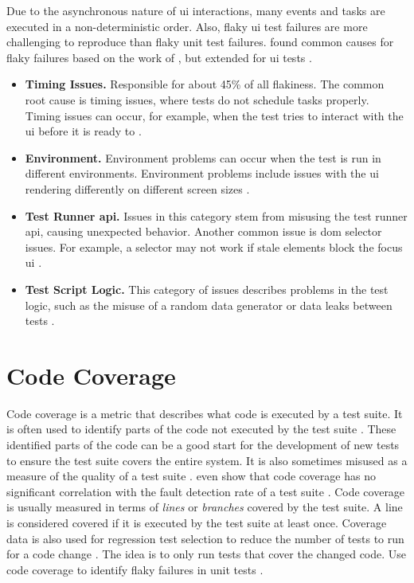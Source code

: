 Due to the asynchronous nature of \ac{ui} interactions, many events and tasks are executed in a non-deterministic order.
Also, flaky \ac{ui} test failures are more challenging to reproduce than flaky unit test failures.
 found common causes for flaky failures based on the work of \citeauthor*{luo_empirical_2014}, but extended for \ac{ui} tests \autocite{luo_empirical_2014,romano_empirical_2021}.

\begin{itemize}
	\item \textbf{Timing Issues.} Responsible for about 45\% of all flakiness. The common root cause is timing issues, where tests do not schedule tasks properly.
	      Timing issues can occur, for example, when the test tries to interact with the \ac{ui} before it is ready to \autocite{romano_empirical_2021}.
	\item \textbf{Environment.} Environment problems can occur when the test is run in different environments.
	      Environment problems include issues with the \ac{ui} rendering differently on different screen sizes \autocite{romano_empirical_2021}.
	\item \textbf{Test Runner \acs{api}.} Issues in this category stem from misusing the test runner \ac{api}, causing unexpected behavior.
	      Another common issue is \ac{dom} selector issues. For example, a selector may not work if stale elements block the focus \ac{ui} \autocite{romano_empirical_2021}.
	\item \textbf{Test Script Logic.} This category of issues describes problems in the test logic, such as the misuse of a random data generator or data leaks between tests \autocite{romano_empirical_2021}.
\end{itemize}


\section{Code Coverage}

Code coverage is a metric that describes what code is executed by a test suite.
It is often used to identify parts of the code not executed by the test suite \autocite{marick_brian_and_smith_john_and_jones_mark_how_1999}.
These identified parts of the code can be a good start for the development of new tests to ensure the test suite covers the entire system.
It is also sometimes misused as a measure of the quality of a test suite \autocite{martin_fowler_bliki_2012}.
 even show that code coverage has no significant correlation with the fault detection rate of a test suite \autocite{kochhar_code_2017}.
Code coverage is usually measured in terms of \emph{lines} or \emph{branches} covered by the test suite.
A line is considered covered if it is executed by the test suite at least once.
Coverage data is also used for regression test selection to reduce the number of tests to run for a code change \autocite{rothermel_empirical_1998}.
The idea is to only run tests that cover the changed code.
 Use code coverage to identify flaky failures in unit tests \autocite{bell_deflaker_2018}.

